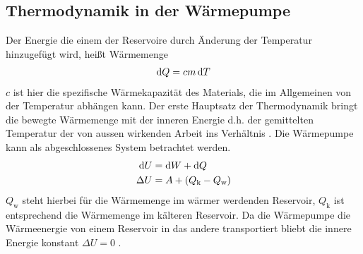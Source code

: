 \subsection{Thermodynamik in der Wärmepumpe}

Der Energie die einem der Reservoire durch Änderung der Temperatur hinzugefügt wird,
heißt Wärmemenge
\begin{align}
    \mathop{}\!\mathrm{d} Q = c m \mathop{}\!\mathrm{d} T 
    \label{eq:dQ}
\end{align} 
$ c $ ist hier die spezifische Wärmekapazität des Materials,
 die im Allgemeinen von der Temperatur abhängen kann.
Der erste Hauptsatz der Thermodynamik bringt die bewegte Wärmemenge
mit der inneren Energie d.h. der gemittelten Temperatur der von aussen wirkenden Arbeit
ins Verhältnis \cite[vgl][318]{demtroeder}. 
Die Wärmepumpe kann als abgeschlossenes System betrachtet werden. 
\begin{align}
                \mathop{}\!\mathrm{d} U &= \mathop{}\!\mathrm{d} W + \mathop{}\!\mathrm{d} Q \\
    \nonumber   \Delta U &= A + ( Q_\text{k} - Q_\text{w})
\end{align}
$Q_\text{w}$ steht hierbei für die Wärmemenge im wärmer werdenden Reservoir, $Q_\text{k}$ ist entsprechend die Wärmemenge im kälteren Reservoir.
Da die Wärmepumpe die Wärmeenergie von einem Reservoir in das andere transportiert
    bliebt die innere Energie konstant $ \Delta U = 0 $ .

